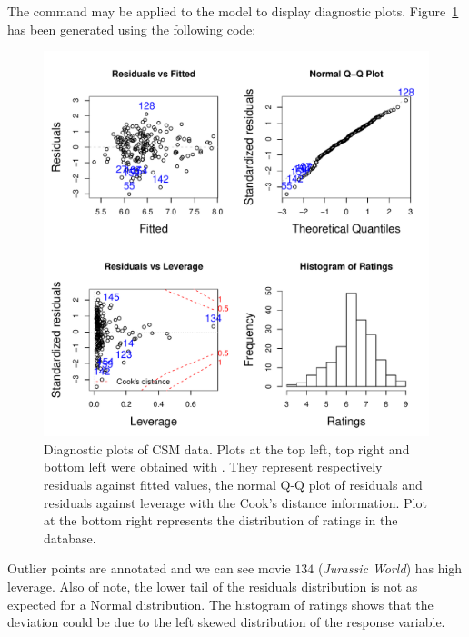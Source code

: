 The  command may be applied to the model to display diagnostic plots. Figure~\ref{fig:csm_Figure1} has been generated using the following code:




\begin{figure}[htbp]
\centering
\includegraphics[width = \textwidth]{figure1.pdf}
\caption{\label{fig:csm_Figure1} Diagnostic plots of CSM data. Plots at the top left, top right and bottom left were obtained with . They represent respectively residuals against fitted values, the normal Q-Q plot of residuals and residuals against leverage with the Cook's distance information. Plot at the bottom right represents the distribution of ratings in the database.}
\end{figure}

Outlier points are annotated and we can see movie $134$ (\textit{Jurassic World}) has high leverage. Also of note, the lower tail of the residuals distribution is not as expected for a Normal distribution. The histogram of ratings shows that the deviation could be due to the left skewed distribution of the response variable. 



